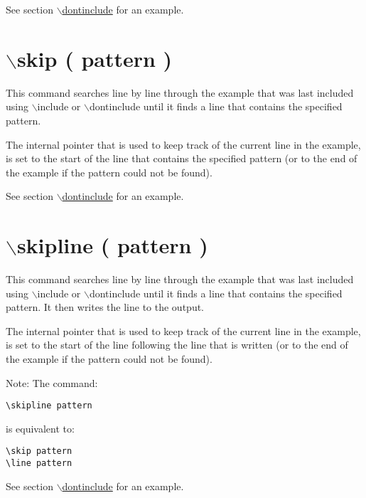 See section \hyperlink{commands_cmddontinclude}{$\backslash$dontinclude} for an example.



 \hypertarget{commands_cmdskip}{}\section{$\backslash$skip ( pattern )}\label{commands_cmdskip}
 This command searches line by line through the example that was last included using $\backslash$include or $\backslash$dontinclude until it finds a line that contains the specified pattern.

The internal pointer that is used to keep track of the current line in the example, is set to the start of the line that contains the specified pattern (or to the end of the example if the pattern could not be found).

See section \hyperlink{commands_cmddontinclude}{$\backslash$dontinclude} for an example.



 \hypertarget{commands_cmdskipline}{}\section{$\backslash$skipline ( pattern )}\label{commands_cmdskipline}
 This command searches line by line through the example that was last included using $\backslash$include or $\backslash$dontinclude until it finds a line that contains the specified pattern. It then writes the line to the output.

The internal pointer that is used to keep track of the current line in the example, is set to the start of the line following the line that is written (or to the end of the example if the pattern could not be found).

\begin{Desc}
\item[Note:]The command: 

\footnotesize\begin{verbatim}\skipline pattern\end{verbatim}
\normalsize
 is equivalent to: 

\footnotesize\begin{verbatim}
\skip pattern
\line pattern\end{verbatim}
\normalsize
\end{Desc}
See section \hyperlink{commands_cmddontinclude}{$\backslash$dontinclude} for an example.



